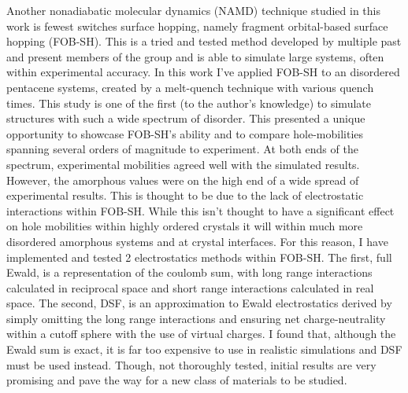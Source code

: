 Another nonadiabatic molecular dynamics (NAMD) technique studied in this work is fewest switches surface hopping, namely fragment orbital-based surface hopping (FOB-SH). This is a tried and tested method developed by multiple past and present members of the group and is able to simulate large systems, often within experimental accuracy. In this work I've applied FOB-SH to an disordered pentacene systems, created by a melt-quench technique with various quench times. This study is one of the first (to the author's knowledge) to simulate structures with such a wide spectrum of disorder. This presented a unique opportunity to showcase FOB-SH's ability and to compare hole-mobilities spanning several orders of magnitude to experiment. At both ends of the spectrum, experimental mobilities agreed well with the simulated results. However, the amorphous values were on the high end of a wide spread of experimental results. This is thought to be due to the lack of electrostatic interactions within FOB-SH. While this isn't thought to have a significant effect on hole mobilities within highly ordered crystals it will within much more disordered amorphous systems and at crystal interfaces. For this reason, I have implemented and tested 2 electrostatics methods within FOB-SH. The first, full Ewald, is a representation of the coulomb sum, with long range interactions calculated in reciprocal space and short range interactions calculated in real space. The second, DSF, is an approximation to Ewald electrostatics derived by simply omitting the long range interactions and ensuring net charge-neutrality within a cutoff sphere with the use of virtual charges. I found that, although the Ewald sum is exact, it is far too expensive to use in realistic simulations and DSF must be used instead. Though, not thoroughly tested, initial results are very promising and pave the way for a new class of materials to be studied.
